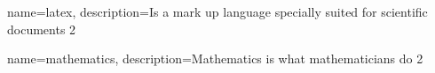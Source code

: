 {
	name=latex,
    description={Is a mark up language specially suited 
    for scientific documents 2}
}

{
    name=mathematics,
    description={Mathematics is what mathematicians do 2}
}
